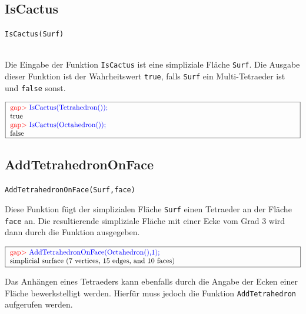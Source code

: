 \documentclass[12pt,titlepage,twoside,cleardoublepage]{article}
\theoremstyle{nummermitklammern}
\numberwithin{equation}{section}
\begin{document}
\subsection{IsCactus}
\begin{large}
\texttt{IsCactus(Surf)}
\end{large}\\
Die Eingabe der Funktion \texttt{IsCactus} ist eine simpliziale Fläche \texttt{Surf}. Die Ausgabe dieser Funktion ist der Wahrheitswert \texttt{true}, falls \texttt{Surf} ein Multi-Tetraeder ist und \texttt{false} sonst. 
\begin{center}
$\fbox{
\parbox{14cm}{
\textcolor{red}{gap$>$} \textcolor{blue}{IsCactus(Tetrahedron());}\newline
true\newline
\textcolor{red}{gap$>$} \textcolor{blue}{IsCactus(Octahedron());}\newline
false
}
}$


\end{center}

\subsection{AddTetrahedronOnFace}
\begin{large}
\texttt{AddTetrahedronOnFace(Surf,face)}
\end{large}
Diese Funktion fügt der  simplizialen Fläche \texttt{Surf} einen Tetraeder an der Fläche \texttt{face} an. Die resultierende simpliziale Fläche mit einer Ecke vom Grad 3 wird dann durch die Funktion ausgegeben.
\begin{center}
$\fbox{
\parbox{14cm}{
\textcolor{red}{gap$>$} \textcolor{blue}{AddTetrahedronOnFace(Octahedron(),1);}\newline
simplicial surface (7 vertices, 15 edges, and 10 faces)
}
}$
\end{center}
Das Anhängen eines Tetraeders kann ebenfalls durch die Angabe der Ecken einer Fläche bewerkstelligt werden. Hierfür muss jedoch die Funktion \texttt{AddTetrahedron} aufgerufen werden.
\end{document}

